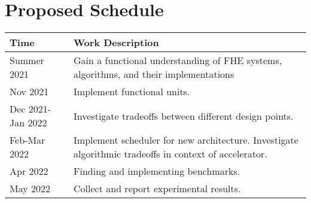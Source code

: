 \section{Proposed Schedule}

\begin{table}[h]
\centering
\begin{tabular}{l p{}}
\toprule[1.5pt]
Time & Work Description \\
\hline
Summer 2021 & Gain a functional understanding of FHE systems, algorithms, and
 their implementations\\
Nov 2021 & Implement functional units.\\
Dec 2021-Jan 2022 & Investigate tradeoffs between different design points. \\
Feb-Mar 2022 & Implement scheduler for new architecture. Investigate algorithmic tradeoffs in context of accelerator.\\
Apr 2022 & Finding and implementing benchmarks.\\
May 2022 & Collect and report experimental results.\\
\bottomrule[1.5pt]
\end{tabular}
\end{table}
